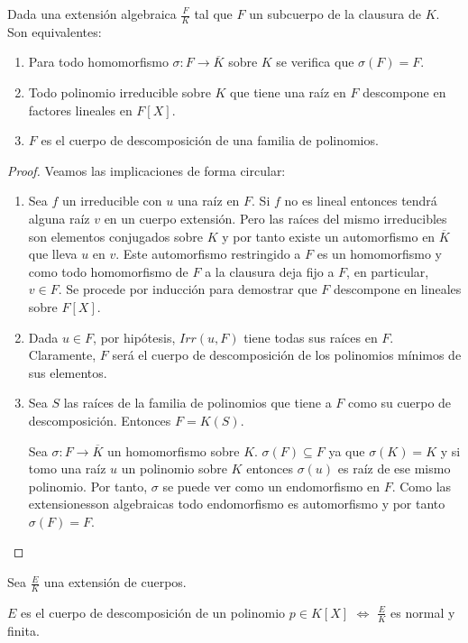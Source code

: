 \begin{proposition}
Dada una extensión algebraica $\frac{F}{K}$ tal que $F$ un subcuerpo de la clausura de $K$. Son equivalentes:

\begin{enumerate}
\item Para todo homomorfismo $\sigma:F \to \overline{K}$ sobre $K$ se verifica que $\sigma(F) = F$. 
\item Todo polinomio irreducible sobre $K$ que tiene una raíz en $F$ descompone en factores lineales en $F[X]$. 
\item $F$ es el cuerpo de descomposición de una familia de polinomios. 
\end{enumerate}
\end{proposition}
\begin{proof}
Veamos las implicaciones de forma circular:

\begin{enumerate}
\item Sea $f$ un irreducible con $u$ una raíz en $F$. Si $f$ no es lineal entonces tendrá alguna raíz $v$ en un cuerpo extensión. Pero las raíces del mismo irreducibles son elementos conjugados sobre $K$ y por tanto existe un automorfismo en $\overline{K}$ que lleva $u$ en $v$. Este automorfismo restringido a $F$ es un homomorfismo y como todo homomorfismo de $F$ a la clausura deja fijo a $F$, en particular, $v \in F$. Se procede por inducción para demostrar que $F$ descompone en lineales sobre $F[X]$. 
\item Dada $u \in F$, por hipótesis, $Irr(u,F)$ tiene todas sus raíces en $F$. Claramente, $F$ será el cuerpo de descomposición de los polinomios mínimos de sus elementos.
\item Sea $S$ las raíces de la familia de polinomios que tiene a $F$ como su cuerpo de descomposición. Entonces $F = K(S)$. 

Sea $\sigma:F \to \overline{K}$ un homomorfismo sobre $K$. $\sigma(F) \subseteq F$ ya que $\sigma(K) = K$ y si tomo una raíz $u$ un polinomio sobre $K$ entonces $\sigma(u)$ es raíz de ese mismo polinomio. Por tanto, $\sigma$ se puede ver como un endomorfismo en $F$. Como las extensionesson algebraicas todo endomorfismo es automorfismo y por tanto $\sigma(F) = F$. 
\end{enumerate}
\end{proof}

\begin{proposition}
Sea $\frac{E}{K}$ una extensión de cuerpos. 

$E$ es el cuerpo de descomposición de un polinomio $p \in K[X]$ $\iff$ $\frac{E}{K}$ es normal y finita.
\end{proposition}

